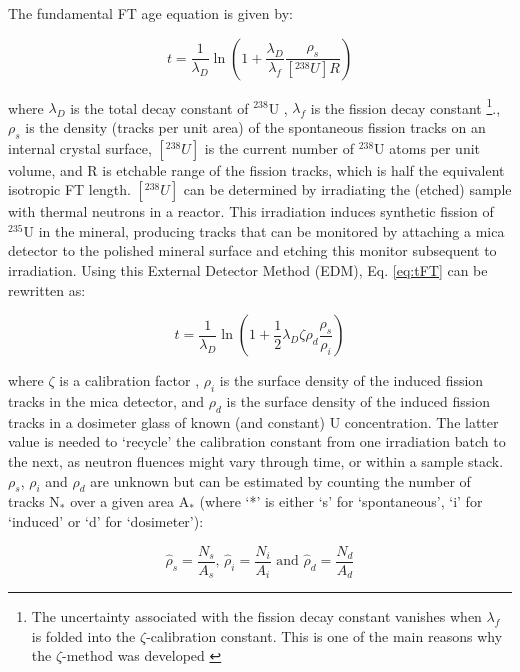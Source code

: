 \documentclass{article}
\begin{document}
The fundamental FT age equation is given by:

\begin{equation}
t = \frac{1}{\lambda_D}
\ln \left(1 + \frac{\lambda_D}{\lambda_f}\frac{\rho_s}{[^{238}U] R}\right)
\label{eq:tFT}
\end{equation}

where $\lambda_D$ is the total decay constant of $^{238}$U
\citep[1.55125$\times10^{-10}yr^{-1}$;][]{jaffey1971}, $\lambda_f$ is
the fission decay constant
\citep[7.9-8.7$\times$10$^{-17}yr^{-1}$;][]{holden2000}\footnote{The
  uncertainty associated with the fission decay constant vanishes when
  $\lambda_f$ is folded into the $\zeta$-calibration constant. This is
  one of the main reasons why the $\zeta$-method was developed
  \citep[see Chap.~1][]{hurford2018}}., $\rho_s$ is the density
(tracks per unit area) of the spontaneous fission tracks on an
internal crystal surface, $[^{238}U]$ is the current number of
$^{238}$U atoms per unit volume, and R is etchable range of the
fission tracks, which is half the equivalent isotropic FT length.
$[^{238}U]$ can be determined by irradiating the (etched) sample with
thermal neutrons in a reactor. This irradiation induces synthetic
fission of $^{235}$U in the mineral, producing tracks that can be
monitored by attaching a mica detector to the polished mineral surface
and etching this monitor subsequent to irradiation. Using this
External Detector Method (EDM), Eq. \ref{eq:tFT} can be rewritten as:

\begin{equation}
t = \frac{1}{\lambda_D}\ln \left(1+\frac{1}{2}\lambda_D\zeta\rho_d\frac{\rho_s}{\rho_i}\right)
\label{eq:tzeta}
\end{equation}

where $\zeta$ is a calibration factor \citep{hurford1983}, $\rho_i$ is
the surface density of the induced fission tracks in the mica
detector, and $\rho_d$ is the surface density of the induced fission
tracks in a dosimeter glass of known (and constant) U
concentration. The latter value is needed to `recycle' the calibration
constant from one irradiation batch to the next, as neutron fluences
might vary through time, or within a sample stack. $\rho_s$, $\rho_i$
and $\rho_d$ are unknown but can be estimated by counting the number
of tracks N$_*$ over a given area A$_*$ (where `*' is either `s' for
`spontaneous', `i' for `induced' or `d' for `dosimeter'):

\begin{equation}
\hat{\rho}_s = \frac{N_s}{A_s} \mbox{,~}
\hat{\rho}_i = \frac{N_i}{A_i} \mbox{~and~}
\hat{\rho}_d = \frac{N_d}{A_d}
\end{equation}
\end{document}
